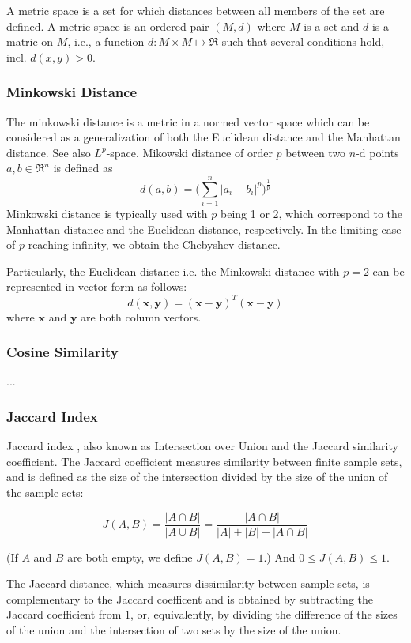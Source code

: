 A metric space is a set for which distances between all members of the set are
defined. A metric space is an ordered pair $(M,d)$ where $M$ is a set and $d$
is a matric on $M$, i.e., a function $d:M\times M\mapsto \Re$ such that several
conditions hold, incl. $d(x,y)>0$.

\subsubsection{Minkowski Distance}

The minkowski distance is a metric in a normed vector space which can be
considered as a generalization of both the Euclidean distance and the Manhattan
distance. See also $L^p$-space. Mikowski distance of order $p$ between two
$n$-d points $a,b\in\Re^n$ is defined as $$d(a, b) = \Big( \sum_{i=1}^n |a_i -
b_i|^p \Big)^{\frac{1}{p}}$$ Minkowski distance is typically used with $p$
being 1 or 2, which correspond to the Manhattan distance and the Euclidean
distance, respectively. In the limiting case of $p$ reaching infinity, we
obtain the Chebyshev distance.

Particularly, the Euclidean distance i.e. the Minkowski distance with $p=2$
can be represented in vector form as follows:
$$ d(\mathbf{x},\mathbf{y}) = (\mathbf{x}-\mathbf{y})^T(\mathbf{x}-\mathbf{y})$$
where $\mathbf{x}$ and $\mathbf{y}$ are both column vectors.

\subsubsection{Cosine Similarity}

...

\subsubsection{Jaccard Index}

Jaccard index , also known as Intersection over Union and the Jaccard
similarity coefficient. The Jaccard coefficient measures similarity between
finite sample sets, and is defined as the size of the intersection divided by
the size of the union of the sample sets:

$$ J(A,B) = \frac{|A\cap B|}{|A\cup B|} = \frac{|A\cap B|}{|A|+|B|-|A\cap B|} $$

(If $A$ and $B$ are both empty, we define $J(A,B)=1$.) And $0\leq J(A,B)\leq 1$.

The Jaccard distance, which measures dissimilarity between sample sets, is
complementary to the Jaccard coefficent and is obtained by subtracting the
Jaccard coefficient from $1$, or, equivalently, by dividing the difference of
the sizes of the union and the intersection of two sets by the size of the
union.

